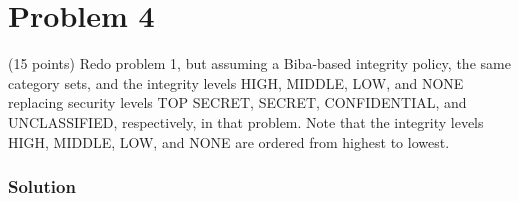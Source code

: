 \section*{Problem 4}
 (15 points) Redo problem 1, but assuming a Biba-based integrity policy, the same category sets, and the integrity levels HIGH, MIDDLE, LOW, and NONE replacing security levels TOP SECRET, SECRET, CONFIDENTIAL, and UNCLASSIFIED, respectively, in that problem.
Note that the integrity levels HIGH, MIDDLE, LOW, and NONE are ordered from highest to lowest.

\subsubsection*{Solution}

